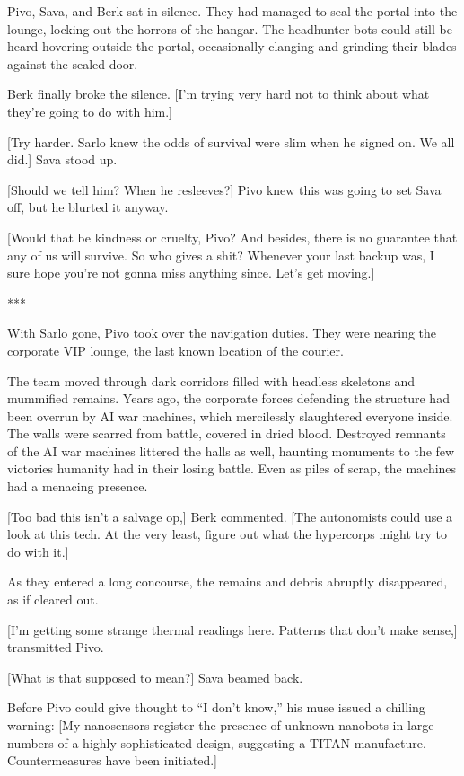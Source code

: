 Pivo, Sava, and Berk sat in silence. They had managed to seal the portal into the lounge, locking out the horrors of the hangar. The headhunter bots could still be heard hovering outside the portal, occasionally clanging and grinding their blades against the sealed door.

Berk finally broke the silence. [I'm trying very hard not to think about what they're going to do with him.]

[Try harder. Sarlo knew the odds of survival were slim when he signed on. We all did.] Sava stood up.

[Should we tell him? When he resleeves?] Pivo knew this was going to set Sava off, but he blurted it anyway.

[Would that be kindness or cruelty, Pivo? And besides, there is no guarantee that any of us will survive. So who gives a shit? Whenever your last backup was, I sure hope you're not gonna miss anything since. Let's get moving.]

\begin{center} *** \end{center}

With Sarlo gone, Pivo took over the navigation duties. They were nearing the corporate VIP lounge, the last known location of the courier.

The team moved through dark corridors filled with headless skeletons and mummified remains. Years ago, the corporate forces defending the structure had been overrun by AI war machines, which mercilessly slaughtered everyone inside. The walls were scarred from battle, covered in dried blood. Destroyed remnants of the AI war machines littered the halls as well, haunting monuments to the few victories humanity had in their losing battle. Even as piles of scrap, the machines had a menacing presence.

[Too bad this isn't a salvage op,] Berk commented. [The autonomists could use a look at this tech. At the very least, figure out what the hypercorps might try to do with it.]

As they entered a long concourse, the remains and debris abruptly disappeared, as if cleared out.

[I'm getting some strange thermal readings here. Patterns that don't make sense,] transmitted Pivo.

[What is that supposed to mean?] Sava beamed back.

Before Pivo could give thought to ``I don't know,'' his muse issued a chilling warning: [My nanosensors register the presence of unknown nanobots in large numbers of a highly sophisticated design, suggesting a TITAN manufacture. Countermeasures have been initiated.]

